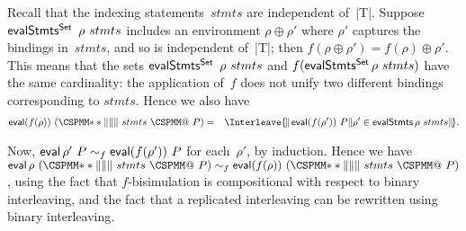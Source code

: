 Recall that the indexing statements~$stmts$ are independent of~|T|.  Suppose
$\mathop{\sf evalStmts^{Set}}~\rho~stmts$ includes an environment $\rho \oplus \rho'$ where
$\rho'$ captures the bindings in~$stmts$, and so is independent of~|T|; 
then $f(\rho \oplus \rho') = f(\rho) \oplus \rho'$.  
This means that the sets $\mathop{\sf evalStmts^{Set}}~\rho~stmts$ and
$f(\mathop{\sf evalStmts^{Set}} \rho~stmts)$ have the same cardinality: the application
of~$f$ does not unify two different bindings corresponding to $stmts$.
Hence we also have
%
\begin{eqnarray*}
\eval (f(\rho))~(\M{**\|\|\|} ~ stmts ~ \M{@} ~ P) & = & 
   \Interleave \mset{ \eval (f(\rho'))~P \| \rho' \in \evalStmts \rho~stmts }.
\end{eqnarray*}


Now, $\mathop{\sf eval} \rho'~P \sim_f \mathop{\sf eval} (f(\rho'))~P$ for each~$\rho'$, by
induction.  
Hence we have $\eval \rho ~(\M{**\|\|\|} ~ stmts ~ \M{@} ~
P) \bisim_f \eval (f(\rho))~(\M{**\|\|\|} ~ stmts ~ \M{@} ~ P)$, using the
fact that $f$-bisimulation is compositional with respect to binary
interleaving, and the fact that a replicated interleaving can be rewritten
using binary interleaving.





